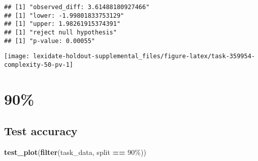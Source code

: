 \documentclass[
]{book}
\newenvironment{Shaded}{\begin{snugshade}}{\end{snugshade}}
\newcommand{\AttributeTok}[1]{\textcolor[rgb]{0.13,0.29,0.53}{#1}}
\newcommand{\DecValTok}[1]{\textcolor[rgb]{0.00,0.00,0.81}{#1}}
\newcommand{\FunctionTok}[1]{\textcolor[rgb]{0.13,0.29,0.53}{\textbf{#1}}}
\newcommand{\NormalTok}[1]{#1}
\newcommand{\OtherTok}[1]{\textcolor[rgb]{0.56,0.35,0.01}{#1}}
\newcommand{\SpecialCharTok}[1]{\textcolor[rgb]{0.81,0.36,0.00}{\textbf{#1}}}
\newcommand{\StringTok}[1]{\textcolor[rgb]{0.31,0.60,0.02}{#1}}
\begin{document}
\begin{Shaded}
\end{Shaded}

\begin{verbatim}
## [1] "observed_diff: 3.61488180927466"
## [1] "lower: -1.99801833753129"
## [1] "upper: 1.98261915374391"
## [1] "reject null hypothesis"
## [1] "p-value: 0.00055"
\end{verbatim}

\texttt{[image: lexidate-holdout-supplemental\_files/figure-latex/task-359954-complexity-50-pv-1]}

\hypertarget{section-8}{%
\section{90\%}\label{section-8}}

\hypertarget{test-accuracy-8}{%
\subsection{Test accuracy}\label{test-accuracy-8}}

\begin{Shaded}
\begin{Highlighting}[]
\FunctionTok{test\_plot}\NormalTok{(}\FunctionTok{filter}\NormalTok{(task\_data, split }\SpecialCharTok{==} \StringTok{\textquotesingle{}90\%\textquotesingle{}}\NormalTok{))}
\end{Highlighting}
\end{Shaded}
\end{document}
